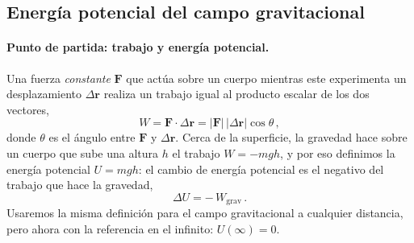 
\subsection{Energía potencial del campo gravitacional}
\label{subsec:energia_potencial_gravitacional}

\paragraph{Punto de partida: trabajo y energía potencial.}
Una fuerza \emph{constante} $\boldsymbol{F}$ que actúa sobre un cuerpo mientras
este experimenta un desplazamiento $\Delta\boldsymbol{r}$ realiza un trabajo
igual al producto escalar de los dos vectores,
\begin{equation}
  W = \boldsymbol{F}\cdot\Delta\boldsymbol{r}
    = \lvert\boldsymbol{F}\rvert\,\lvert\Delta\boldsymbol{r}\rvert\cos\theta \,,
  \label{eq:trabajo_producto_escalar}
\end{equation}
donde $\theta$ es el ángulo entre $\boldsymbol{F}$ y $\Delta\boldsymbol{r}$.
Cerca de la superficie, la gravedad hace sobre un cuerpo que sube una altura
$h$ el trabajo $W = -mgh$, y por eso definimos la energía potencial
$U = mgh$: el cambio de energía potencial es el negativo del trabajo que hace
la gravedad,
\begin{equation}
  \Delta U = -\,W_{\text{grav}} \,.
  \label{eq:def_cambio_epot}
\end{equation}
Usaremos la misma definición para el campo gravitacional a cualquier
distancia, pero ahora con la referencia en el infinito: $U(\infty) = 0$.

